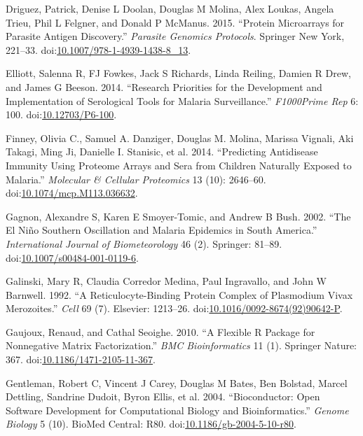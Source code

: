 \documentclass[a4paper]{article}
\begin{document}
\hypertarget{ref-Driguez2015}{}
Driguez, Patrick, Denise L Doolan, Douglas M Molina, Alex Loukas, Angela
Trieu, Phil L Felgner, and Donald P McManus. 2015. ``Protein Microarrays
for Parasite Antigen Discovery.'' \emph{Parasite Genomics Protocols}.
Springer New York, 221--33.
doi:\href{https://doi.org/10.1007/978-1-4939-1438-8_13}{10.1007/978-1-4939-1438-8\_13}.

\hypertarget{ref-elliott2014}{}
Elliott, Salenna R, FJ Fowkes, Jack S Richards, Linda Reiling, Damien R
Drew, and James G Beeson. 2014. ``Research Priorities for the
Development and Implementation of Serological Tools for Malaria
Surveillance.'' \emph{F1000Prime Rep} 6: 100.
doi:\href{https://doi.org/10.12703/P6-100}{10.12703/P6-100}.

\hypertarget{ref-Finney2014}{}
Finney, Olivia C., Samuel A. Danziger, Douglas M. Molina, Marissa
Vignali, Aki Takagi, Ming Ji, Danielle I. Stanisic, et al. 2014.
``Predicting Antidisease Immunity Using Proteome Arrays and Sera from
Children Naturally Exposed to Malaria.'' \emph{Molecular \& Cellular
Proteomics} 13 (10): 2646--60.
doi:\href{https://doi.org/10.1074/mcp.M113.036632}{10.1074/mcp.M113.036632}.

\hypertarget{ref-gagnon2002enso}{}
Gagnon, Alexandre S, Karen E Smoyer-Tomic, and Andrew B Bush. 2002.
``The El Niño Southern Oscillation and Malaria Epidemics in South
America.'' \emph{International Journal of Biometeorology} 46 (2).
Springer: 81--89.
doi:\href{https://doi.org/10.1007/s00484-001-0119-6}{10.1007/s00484-001-0119-6}.

\hypertarget{ref-galinski1992rbp}{}
Galinski, Mary R, Claudia Corredor Medina, Paul Ingravallo, and John W
Barnwell. 1992. ``A Reticulocyte-Binding Protein Complex of Plasmodium
Vivax Merozoites.'' \emph{Cell} 69 (7). Elsevier: 1213--26.
doi:\href{https://doi.org/10.1016/0092-8674(92)90642-P}{10.1016/0092-8674(92)90642-P}.

\hypertarget{ref-Gaujoux2010NMF}{}
Gaujoux, Renaud, and Cathal Seoighe. 2010. ``A Flexible R Package for
Nonnegative Matrix Factorization.'' \emph{BMC Bioinformatics} 11 (1).
Springer Nature: 367.
doi:\href{https://doi.org/10.1186/1471-2105-11-367}{10.1186/1471-2105-11-367}.

\hypertarget{ref-bioconductor2004}{}
Gentleman, Robert C, Vincent J Carey, Douglas M Bates, Ben Bolstad,
Marcel Dettling, Sandrine Dudoit, Byron Ellis, et al. 2004.
``Bioconductor: Open Software Development for Computational Biology and
Bioinformatics.'' \emph{Genome Biology} 5 (10). BioMed Central: R80.
doi:\href{https://doi.org/10.1186/gb-2004-5-10-r80}{10.1186/gb-2004-5-10-r80}.
\end{document}
